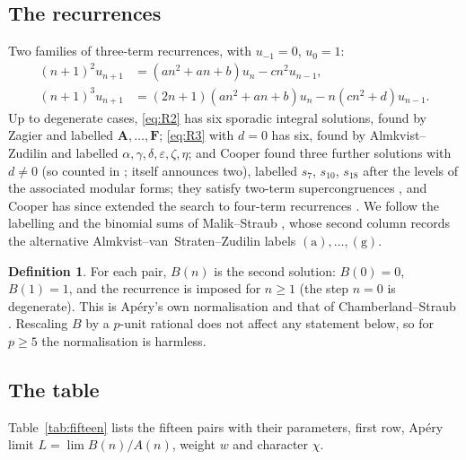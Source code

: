 \documentclass[11pt,reqno]{amsart}
\theoremstyle{plain}
\theoremstyle{definition}
\newtheorem{definition}[theorem]{Definition}
\theoremstyle{remark}
\numberwithin{equation}{section}
\begin{document}
\subsection{The recurrences}
Two families of three-term recurrences, with $u_{-1}=0$, $u_0=1$:
\begin{align}
  (n+1)^2u_{n+1}&=(an^2+an+b)u_n-cn^2u_{n-1},\label{eq:R2}\\
  (n+1)^3u_{n+1}&=(2n+1)(an^2+an+b)u_n-n(cn^2+d)u_{n-1}.\label{eq:R3}
\end{align}
Up to degenerate cases, \eqref{eq:R2} has six sporadic integral solutions, found by Zagier
\cite{Zagier2009} and labelled $\mathbf A,\dots,\mathbf F$; \eqref{eq:R3} with $d=0$ has six,
found by Almkvist--Zudilin \cite{AlmkvistZudilin2006} and labelled
$\alpha,\gamma,\delta,\varepsilon,\zeta,\eta$; and Cooper \cite{Cooper2012} found three
further solutions with $d\ne0$ (so counted in \cite[\S2]{MalikStraub}; \cite{Cooper2012}
itself announces two), labelled $s_7$, $s_{10}$, $s_{18}$ after the levels of the
associated modular forms; they satisfy two-term supercongruences \cite{OsburnSahuStraub},
and Cooper has since extended the search to four-term recurrences \cite{Cooper2302}. We
follow the labelling and the binomial sums of Malik--Straub \cite[Tables 1--2]{MalikStraub},
whose second column records the alternative Almkvist--van~Straten--Zudilin labels
$(\mathrm a),\dots,(\mathrm g)$.

\begin{definition}\label{def:B}
For each pair, $B(n)$ is the second solution: $B(0)=0$, $B(1)=1$, and the recurrence is
imposed for $n\ge1$ (the step $n=0$ is degenerate). This is Ap\'ery's own normalisation and
that of Chamberland--Straub \cite{ChamStraub}. Rescaling $B$ by a $p$-unit rational does not
affect any statement below, so for $p\ge5$ the normalisation is harmless.
\end{definition}

\subsection{The table}
Table~\ref{tab:fifteen} lists the fifteen pairs with their parameters, first row, Ap\'ery
limit $L=\lim B(n)/A(n)$, weight $w$ and character $\chi$.
\end{document}
